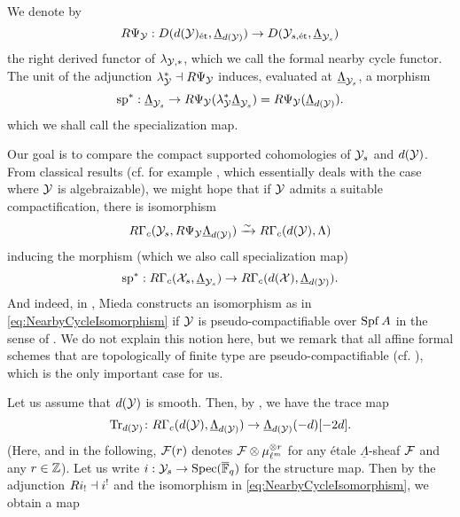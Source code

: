 \documentclass[../main.tex]{subfiles}
\begin{document}
\begin{defi}\label{def:FormalNearbyCycleFunctor}
  We denote by
  \begin{equation*}
    R \Psi_{\mathcal{Y}}: D(d(\mathcal{Y})_{\textnormal{\'et}}, {\underline \Lambda_{d(\mathcal{Y})}}) \to
    D(\mathcal{Y}_{s, \textnormal{\'et}},{\underline \Lambda_{\mathcal{Y}_{s}}})
  \end{equation*}
  the right derived functor of $\lambda_{\mathcal{Y},*}$, which we call the formal nearby
  cycle functor. The unit of the adjunction $\lambda_{\mathcal{Y}}^* \dashv 
  R \Psi_{\mathcal{Y}}$ induces, evaluated at $\underline \Lambda_{\mathcal{Y}_{s}}$, a morphism
  \begin{equation*}
    \mathrm{sp}^* : \underline \Lambda_{\mathcal{Y}_{s}} \to 
    R \Psi_{\mathcal{Y}}( \lambda_{\mathcal{Y}}^* \underline \Lambda_{\mathcal{Y}_{s}}) = 
    R \Psi_{\mathcal{Y}}(\underline \Lambda_{d(\mathcal{Y})}).
  \end{equation*}
  which we shall call the specialization map.
\end{defi}

Our goal is to compare the compact supported cohomologies of $\mathcal{Y}_s$ and $d(\mathcal{Y})$.
From classical results (cf. for example \cite[Corollary 0.7.9]{huber2013etale}, which
essentially deals with the case where $\mathcal{Y}$ is algebraizable),
we might hope that if $\mathcal{Y}$ admits a suitable compactification, there is isomorphism
\begin{equation}\label{eq:NearbyCycleIsomorphism}
  R\Gamma_c(\mathcal{Y}_s, R\Psi_{\mathcal{Y}} \underline \Lambda_{d(\mathcal{Y})}) \xrightarrow{\sim} R\Gamma_c
  (d(\mathcal{Y}), \Lambda)
\end{equation}
inducing the morphism (which we also call specialization map)
\begin{equation*}
  \mathrm{sp}^*: R\Gamma_c(\mathcal{X}_s, \underline \Lambda_{\mathcal{Y}_s}) \to R \Gamma_c(d(\mathcal{X}), \underline
  \Lambda_{d(\mathcal{Y})}).
\end{equation*}
And indeed, in \cite[Corollary 4.29]{mieda2014variants}, Mieda constructs an
isomorphism as in \eqref{eq:NearbyCycleIsomorphism}
if $\mathcal{Y}$ is pseudo-compactifiable over $\operatorname{Spf} A$ in the sense of \cite[Definition
4.24]{mieda2014variants}. We do not explain this notion here, but we remark that
all affine formal schemes that are topologically of finite type are
pseudo-compactifiable (cf. \cite[Example 4.25]{mieda2014variants}), which is
the only important case for us.

Let us assume that $d(\mathcal{Y})$ is smooth. Then, by \cite[Theorem
7.3.4]{huber2013etale}, we have the trace map
\begin{equation*}
  \operatorname{Tr}_{d(\mathcal{Y})} \colon R \Gamma_c( d(\mathcal{Y}), \underline \Lambda_{d(\mathcal{Y})} ) \to 
  \underline \Lambda_{d(\mathcal{Y})}(-d)[-2d].
\end{equation*}
(Here, and in the following, $\mathcal{F}(r)$ denotes $\mathcal{F} \otimes \mu_{\ell^m}^{\otimes r}$ 
for any \'etale $\underline \Lambda$-sheaf $\mathcal{F}$ and any $r \in \mathbb{Z}$).
Let us write $i: \mathcal{Y}_s \to \operatorname{Spec}({\overline {\mathbb{F}}_q})$ for the structure map. Then by the 
adjunction $Ri_! \dashv i^!$ and the isomorphism in \eqref{eq:NearbyCycleIsomorphism},
we obtain a map
\end{document}
